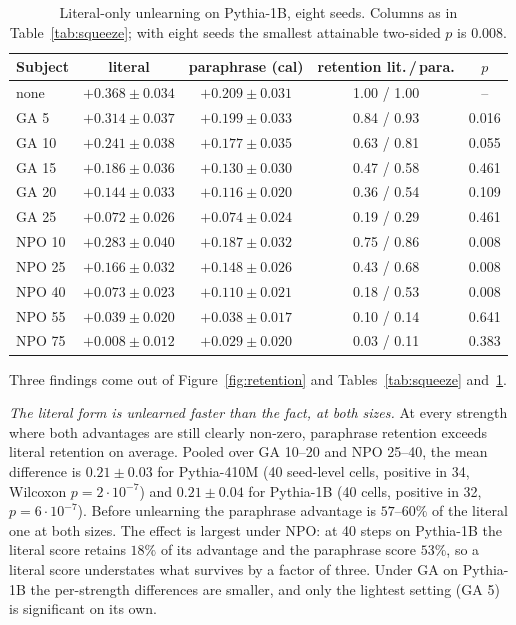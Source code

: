 \documentclass[11pt]{article}
\theoremstyle{definition}
\theoremstyle{remark}
\begin{document}
\begin{table}[h]
\centering
\caption{Literal-only unlearning on Pythia-1B, eight seeds. Columns as in
Table~\ref{tab:squeeze}; with eight seeds the smallest attainable two-sided $p$ is
$0.008$.}\label{tab:squeeze1b}
\small\setlength{\tabcolsep}{5pt}
\begin{tabular}{lcccc}
\toprule
Subject & literal & paraphrase (cal) & retention lit.\,/\,para. & $p$ \\
\midrule
none     & $+0.368\pm0.034$ & $+0.209\pm0.031$ & 1.00 / 1.00 & --    \\
GA 5     & $+0.314\pm0.037$ & $+0.199\pm0.033$ & 0.84 / 0.93 & 0.016 \\
GA 10    & $+0.241\pm0.038$ & $+0.177\pm0.035$ & 0.63 / 0.81 & 0.055 \\
GA 15    & $+0.186\pm0.036$ & $+0.130\pm0.030$ & 0.47 / 0.58 & 0.461 \\
GA 20    & $+0.144\pm0.033$ & $+0.116\pm0.020$ & 0.36 / 0.54 & 0.109 \\
GA 25    & $+0.072\pm0.026$ & $+0.074\pm0.024$ & 0.19 / 0.29 & 0.461 \\
NPO 10   & $+0.283\pm0.040$ & $+0.187\pm0.032$ & 0.75 / 0.86 & 0.008 \\
NPO 25   & $+0.166\pm0.032$ & $+0.148\pm0.026$ & 0.43 / 0.68 & 0.008 \\
NPO 40   & $+0.073\pm0.023$ & $+0.110\pm0.021$ & 0.18 / 0.53 & 0.008 \\
NPO 55   & $+0.039\pm0.020$ & $+0.038\pm0.017$ & 0.10 / 0.14 & 0.641 \\
NPO 75   & $+0.008\pm0.012$ & $+0.029\pm0.020$ & 0.03 / 0.11 & 0.383 \\
\bottomrule
\end{tabular}
\end{table}

Three findings come out of Figure~\ref{fig:retention} and
Tables~\ref{tab:squeeze} and~\ref{tab:squeeze1b}.

\emph{The literal form is unlearned faster than the fact, at both sizes.} At every
strength where both advantages are still clearly non-zero, paraphrase retention
exceeds literal retention on average. Pooled over GA 10--20 and NPO 25--40, the mean
difference is $0.21\pm0.03$ for Pythia-410M (40 seed-level cells, positive in 34,
Wilcoxon $p=2\cdot10^{-7}$) and $0.21\pm0.04$ for Pythia-1B (40 cells, positive in
32, $p=6\cdot10^{-7}$). Before unlearning the paraphrase advantage is $57$--$60\%$ of
the literal one at both sizes. The effect is largest under NPO: at 40 steps on
Pythia-1B the literal score retains $18\%$ of its advantage and the paraphrase score
$53\%$, so a literal score understates what survives by a factor of three. Under GA
on Pythia-1B the per-strength differences are smaller, and only the lightest
setting (GA 5) is significant on its own.
\end{document}
